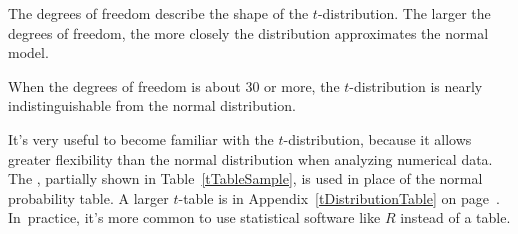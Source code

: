 \begin{termBox}{
The degrees of freedom describe the shape of the $t$-distribution. The larger the degrees of freedom, the more closely the distribution approximates the normal model.}
\end{termBox}

When the degrees of freedom is about 30 or more, the $t$-distribution is nearly indistinguishable from the normal distribution. 

It's very useful to become familiar with the $t$-distribution, because it allows greater flexibility than the normal distribution when analyzing numerical data. The , partially shown in Table~\ref{tTableSample}, is used in place of the normal probability table. A larger $t$-table is in Appendix~\ref{tDistributionTable} on page~\pageref{tDistributionTable}. In~practice, it's more common to use statistical software like $R$ instead of a table. 
